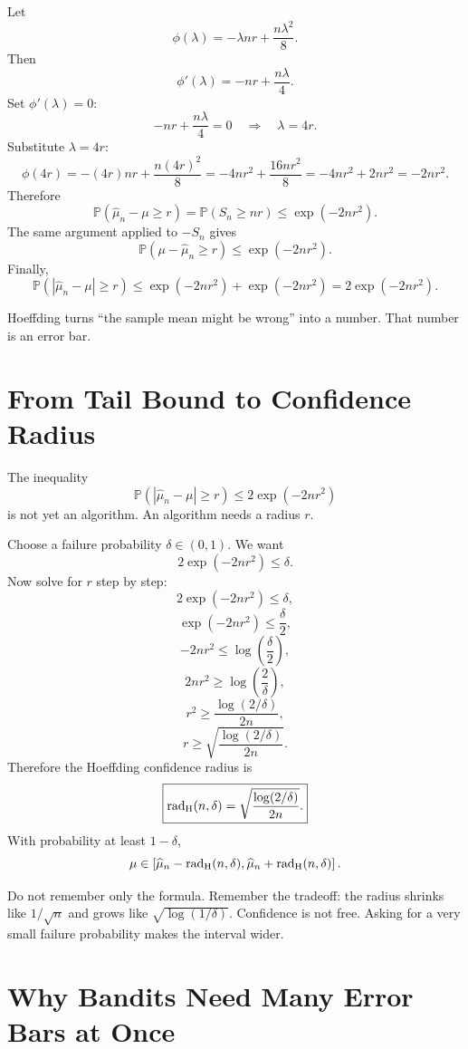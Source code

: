\documentclass[en,nofont,11pt]{elegantbook}
\newcommand{\Pbb}{\mathbb{P}}
\begin{document}
Let
\[
\phi(\lambda)=-\lambda nr+\frac{n\lambda^2}{8}.
\]
Then
\[
\phi'(\lambda)=-nr+\frac{n\lambda}{4}.
\]
Set $\phi'(\lambda)=0$:
\[
-nr+\frac{n\lambda}{4}=0
\quad\Longrightarrow\quad
\lambda=4r.
\]
Substitute $\lambda=4r$:
\[
\phi(4r)=-(4r)nr+\frac{n(4r)^2}{8}
= -4nr^2+\frac{16nr^2}{8}
= -4nr^2+2nr^2
= -2nr^2.
\]
Therefore
\[
\Pbb(\widehat\mu_n-\mu\ge r)
= \Pbb(S_n\ge nr)
\le \exp(-2nr^2).
\]
The same argument applied to $-S_n$ gives
\[
\Pbb(\mu-\widehat\mu_n\ge r)
\le \exp(-2nr^2).
\]
Finally,
\[
\Pbb(|\widehat\mu_n-\mu|\ge r)
\le
\exp(-2nr^2)+\exp(-2nr^2)
=2\exp(-2nr^2).
\]

\begin{keyidea}
Hoeffding turns ``the sample mean might be wrong'' into a number. That number is an error bar.
\end{keyidea}

\chapter{From Tail Bound to Confidence Radius}

The inequality
\[
\Pbb(|\widehat\mu_n-\mu|\ge r)
\le 2\exp(-2nr^2)
\]
is not yet an algorithm. An algorithm needs a radius $r$.

Choose a failure probability $\delta\in(0,1)$. We want
\[
2\exp(-2nr^2)\le \delta.
\]
Now solve for $r$ step by step:
\[
2\exp(-2nr^2)\le \delta,
\]
\[
\exp(-2nr^2)\le \frac{\delta}{2},
\]
\[
-2nr^2 \le \log\left(\frac{\delta}{2}\right),
\]
\[
2nr^2 \ge \log\left(\frac{2}{\delta}\right),
\]
\[
r^2 \ge \frac{\log(2/\delta)}{2n},
\]
\[
r \ge \sqrt{\frac{\log(2/\delta)}{2n}}.
\]
Therefore the Hoeffding confidence radius is
\[
\boxed{
\operatorname{rad}_{\rm H}(n,\delta)
=\sqrt{\frac{\log(2/\delta)}{2n}}.
}
\]
With probability at least $1-\delta$,
\[
\mu\in
\left[
\widehat\mu_n-\operatorname{rad}_{\rm H}(n,\delta),
\widehat\mu_n+\operatorname{rad}_{\rm H}(n,\delta)
\right].
\]

\begin{thinkbox}
Do not remember only the formula. Remember the tradeoff: the radius shrinks like $1/\sqrt n$ and grows like $\sqrt{\log(1/\delta)}$. Confidence is not free. Asking for a very small failure probability makes the interval wider.
\end{thinkbox}

\chapter{Why Bandits Need Many Error Bars at Once}
\end{document}

